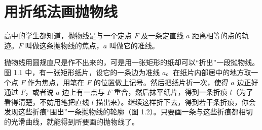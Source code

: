 \section{用折纸法画抛物线}

高中的学生都知道，抛物线是与一个定点 $F$ 及一条定直线 $a$ 距离相等的点的轨迹。$F$ 叫做这条抛物线的焦点，$a$ 叫做它的准线。

抛物线用圆规直尺是作不出来的，可是用一张矩形的纸却可以“折出”一段抛物线。图 1.1 中，有一张矩形纸片，设它的一条边为准线 $a$。在纸片内部居中的地方取一个点 $F$ 作为焦点，用笔在 $F$ 的位置做上记号。然后把纸片折一次，使得 $a$ 边正好通过 $F$，或者说 $a$ 边上有一点与 $F$ 重合，然后抹平纸片，得到一条折痕 $l$（为了看得清楚，不妨用笔把直线 $l$ 描出来）。继续这样折下去，得到若干条折痕，你会发现这些折痕“围出”一条抛物线的轮廓（图 1.2）。只要画一条与这些折痕都相切的光滑曲线，就能得到所要画的抛物线了。


